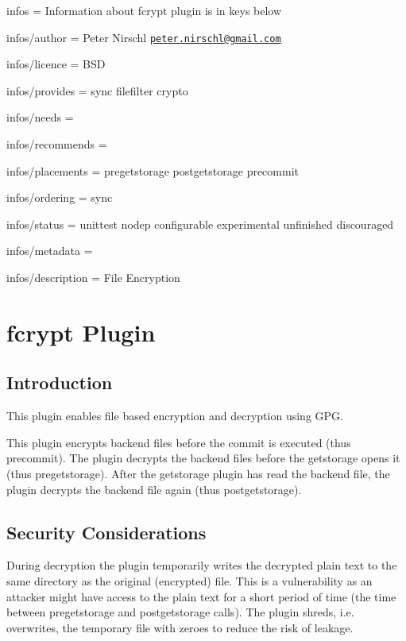 
\begin{DoxyItemize}
\item infos = Information about fcrypt plugin is in keys below
\item infos/author = Peter Nirschl \href{mailto:peter.nirschl@gmail.com}{\tt peter.\+nirschl@gmail.\+com}
\item infos/licence = B\+S\+D
\item infos/provides = sync filefilter crypto
\item infos/needs =
\item infos/recommends =
\item infos/placements = pregetstorage postgetstorage precommit
\item infos/ordering = sync
\item infos/status = unittest nodep configurable experimental unfinished discouraged
\item infos/metadata =
\item infos/description = File Encryption
\end{DoxyItemize}\hypertarget{md_src_plugins_fcrypt_README_src_plugins_fcrypt_README_md}{}\section{fcrypt Plugin}\label{md_src_plugins_fcrypt_README_src_plugins_fcrypt_README_md}
\subsection*{Introduction}

This plugin enables file based encryption and decryption using G\+P\+G.

This plugin encrypts backend files before the commit is executed (thus {\ttfamily precommit}). The plugin decrypts the backend files before the getstorage opens it (thus {\ttfamily pregetstorage}). After the getstorage plugin has read the backend file, the plugin decrypts the backend file again (thus {\ttfamily postgetstorage}).

\subsection*{Security Considerations}

During decryption the plugin temporarily writes the decrypted plain text to the same directory as the original (encrypted) file. This is a vulnerability as an attacker might have access to the plain text for a short period of time (the time between pregetstorage and postgetstorage calls). The plugin shreds, i.\+e. overwrites, the temporary file with zeroes to reduce the risk of leakage.


